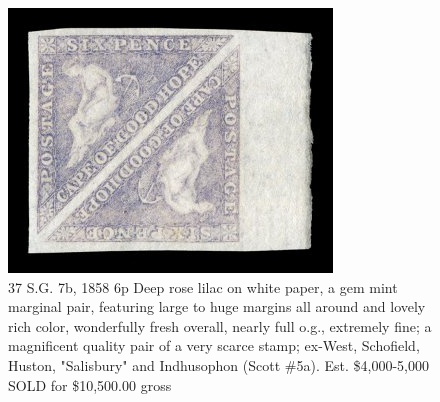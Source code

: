 \begin{figure}[htbp]
\centering
\includegraphics[width=.50\textwidth]{../cape-of-good-hope/SG7b.jpg}
\caption{37		S.G. 7b,	1858 6p Deep rose lilac on white paper, a gem mint marginal pair, featuring large to huge margins all around and lovely rich color, wonderfully fresh overall, nearly full o.g., extremely fine; a magnificent quality pair of a very scarce stamp; ex-West, Schofield, Huston, "Salisbury" and Indhusophon (Scott \#5a).  Est. \$4,000-5,000 
SOLD for \$10,500.00 gross}
\end{figure}
              